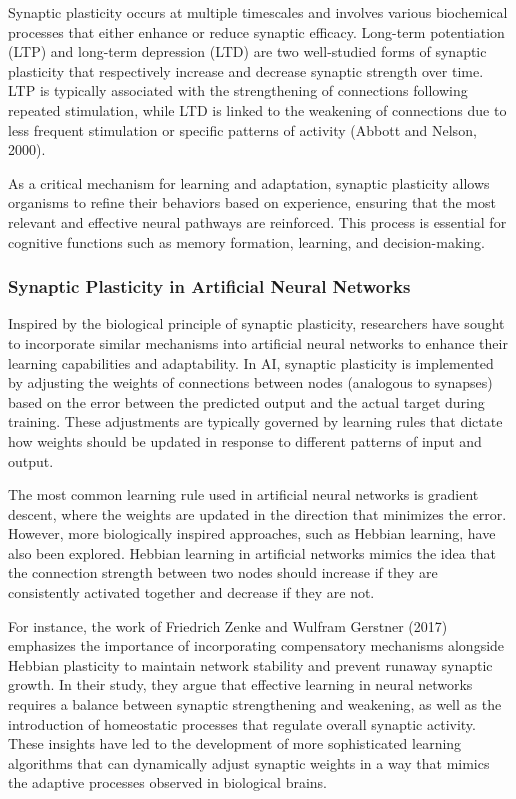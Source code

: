 \documentclass[12pt,twoside]{article}
\begin{document}
Synaptic plasticity occurs at multiple timescales and involves various biochemical processes that either enhance or reduce synaptic efficacy. Long-term potentiation (LTP) and long-term depression (LTD) are two well-studied forms of synaptic plasticity that respectively increase and decrease synaptic strength over time. LTP is typically associated with the strengthening of connections following repeated stimulation, while LTD is linked to the weakening of connections due to less frequent stimulation or specific patterns of activity (Abbott and Nelson, 2000).

As a critical mechanism for learning and adaptation, synaptic plasticity allows organisms to refine their behaviors based on experience, ensuring that the most relevant and effective neural pathways are reinforced. This process is essential for cognitive functions such as memory formation, learning, and decision-making.

\subsubsection{Synaptic Plasticity in Artificial Neural Networks}

Inspired by the biological principle of synaptic plasticity, researchers have sought to incorporate similar mechanisms into artificial neural networks to enhance their learning capabilities and adaptability. In AI, synaptic plasticity is implemented by adjusting the weights of connections between nodes (analogous to synapses) based on the error between the predicted output and the actual target during training. These adjustments are typically governed by learning rules that dictate how weights should be updated in response to different patterns of input and output.

The most common learning rule used in artificial neural networks is gradient descent, where the weights are updated in the direction that minimizes the error. However, more biologically inspired approaches, such as Hebbian learning, have also been explored. Hebbian learning in artificial networks mimics the idea that the connection strength between two nodes should increase if they are consistently activated together and decrease if they are not.

For instance, the work of Friedrich Zenke and Wulfram Gerstner (2017) emphasizes the importance of incorporating compensatory mechanisms alongside Hebbian plasticity to maintain network stability and prevent runaway synaptic growth. In their study, they argue that effective learning in neural networks requires a balance between synaptic strengthening and weakening, as well as the introduction of homeostatic processes that regulate overall synaptic activity. These insights have led to the development of more sophisticated learning algorithms that can dynamically adjust synaptic weights in a way that mimics the adaptive processes observed in biological brains.
\end{document}

